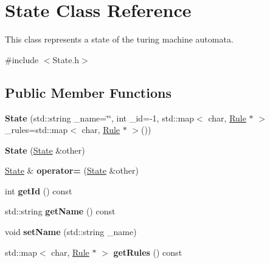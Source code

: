 \hypertarget{class_state}{}\section{State Class Reference}
\label{class_state}


This class represents a state of the turing machine automata.  




{\ttfamily \#include $<$State.\+h$>$}

\subsection*{Public Member Functions}
\begin{DoxyCompactItemize}
\item 
\mbox{\label{class_state_af1646ba0a8934639b1b0038f26a2942b}} 
{\bfseries State} (std\+::string \+\_\+name=\char`\"{}\char`\"{}, int \+\_\+id=-\/1, std\+::map$<$ char, \mbox{\hyperlink{class_rule}{Rule}} $\ast$ $>$ \+\_\+rules=std\+::map$<$ char, \mbox{\hyperlink{class_rule}{Rule}} $\ast$ $>$())
\item 
\mbox{\label{class_state_a676cd913a1596cc0538b5cb9de8ea908}} 
{\bfseries State} (\mbox{\hyperlink{class_state}{State}} \&other)
\item 
\mbox{\label{class_state_a6407270974b54d7494a43a08928441d2}} 
\mbox{\hyperlink{class_state}{State}} \& {\bfseries operator=} (\mbox{\hyperlink{class_state}{State}} \&other)
\item 
\mbox{\label{class_state_af6edc2f223c27ece41521c542db5cb93}} 
int {\bfseries get\+Id} () const
\item 
\mbox{\label{class_state_a7aec8a3796220945cd69224d6980cfe4}} 
std\+::string {\bfseries get\+Name} () const
\item 
\mbox{\label{class_state_ac707f5b0b09bceaf752099b3bd19cd80}} 
void {\bfseries set\+Name} (std\+::string \+\_\+name)
\item 
\mbox{\label{class_state_a36c800c548160516e1f61cf39b37a329}} 
std\+::map$<$ char, \mbox{\hyperlink{class_rule}{Rule}} $\ast$ $>$ {\bfseries get\+Rules} () const

\end{DoxyCompactItemize}
